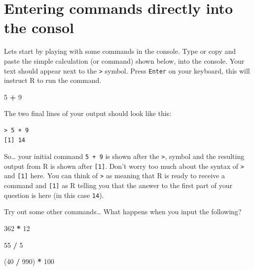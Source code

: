 \documentclass[
]{book}
\newenvironment{Shaded}{\begin{snugshade}}{\end{snugshade}}
\newcommand{\DecValTok}[1]{\textcolor[rgb]{0.00,0.00,0.81}{#1}}
\newcommand{\NormalTok}[1]{#1}
\newcommand{\SpecialCharTok}[1]{\textcolor[rgb]{0.81,0.36,0.00}{\textbf{#1}}}
\begin{document}
\section{Entering commands directly into the consol}\label{entering-commands-directly-into-the-consol}

Lets start by playing with some commands in the console. Type or copy and paste the simple calculation (or command) shown below, into the console. Your text should appear next to the \texttt{\textgreater{}} symbol. Press \texttt{Enter} on your keyboard, this will instruct R to run the command.

\begin{Shaded}
\begin{Highlighting}[]
\DecValTok{5} \SpecialCharTok{+} \DecValTok{9}
\end{Highlighting}
\end{Shaded}

The two final lines of your output should look like this:

\begin{verbatim}
> 5 + 9
[1] 14
\end{verbatim}

So\ldots{} your initial command \texttt{5\ +\ 9} is shown after the \texttt{\textgreater{}}, symbol and the resulting output from R is shown after \texttt{{[}1{]}}. Don't worry too much about the syntax of \texttt{\textgreater{}} and \texttt{{[}1{]}} here. You can think of \texttt{\textgreater{}} as meaning that R is ready to receive a command and \texttt{{[}1{]}} as R telling you that the answer to the first part of your question is here (in this case \texttt{14}).

Try out some other commands\ldots{} What happens when you input the following?

\begin{Shaded}
\begin{Highlighting}[]
\DecValTok{362} \SpecialCharTok{*} \DecValTok{12}
\end{Highlighting}
\end{Shaded}

\begin{Shaded}
\begin{Highlighting}[]
\DecValTok{55} \SpecialCharTok{/} \DecValTok{5}
\end{Highlighting}
\end{Shaded}

\begin{Shaded}
\begin{Highlighting}[]
\NormalTok{(}\DecValTok{40} \SpecialCharTok{/} \DecValTok{990}\NormalTok{) }\SpecialCharTok{*} \DecValTok{100}
\end{Highlighting}
\end{Shaded}
\end{document}
